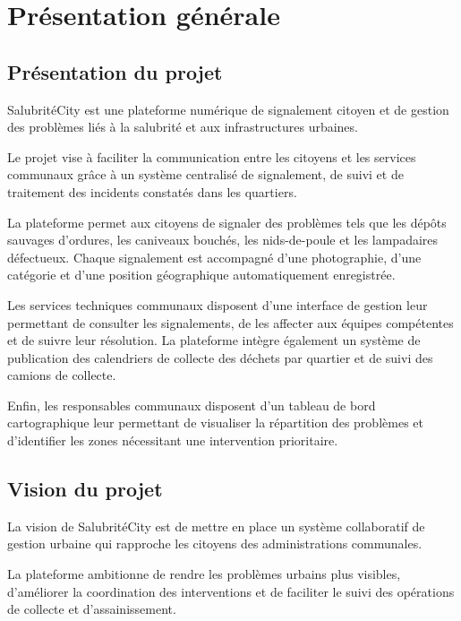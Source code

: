 \documentclass[11pt,a4paper,oneside]{report}
\begin{document}
	
	
	\section{Présentation générale}
	
	\subsection{Présentation du projet}
	
	SalubritéCity est une plateforme numérique de signalement
	citoyen et de gestion des problèmes liés à la salubrité
	et aux infrastructures urbaines.
	
	Le projet vise à faciliter la communication entre les
	citoyens et les services communaux grâce à un système
	centralisé de signalement, de suivi et de traitement
	des incidents constatés dans les quartiers.
	
	La plateforme permet aux citoyens de signaler des
	problèmes tels que les dépôts sauvages d'ordures,
	les caniveaux bouchés, les nids-de-poule et les
	lampadaires défectueux. Chaque signalement est
	accompagné d'une photographie, d'une catégorie et
	d'une position géographique automatiquement enregistrée.
	
	Les services techniques communaux disposent d'une
	interface de gestion leur permettant de consulter les
	signalements, de les affecter aux équipes compétentes
	et de suivre leur résolution. La plateforme intègre
	également un système de publication des calendriers
	de collecte des déchets par quartier et de suivi des
	camions de collecte.
	
	Enfin, les responsables communaux disposent d'un
	tableau de bord cartographique leur permettant de
	visualiser la répartition des problèmes et d'identifier
	les zones nécessitant une intervention prioritaire.
	
	\subsection{Vision du projet}
	
	La vision de SalubritéCity est de mettre en place un
	système collaboratif de gestion urbaine qui rapproche
	les citoyens des administrations communales.
	
	La plateforme ambitionne de rendre les problèmes
	urbains plus visibles, d'améliorer la coordination des
	interventions et de faciliter le suivi des opérations
	de collecte et d'assainissement.
	
\end{document}
